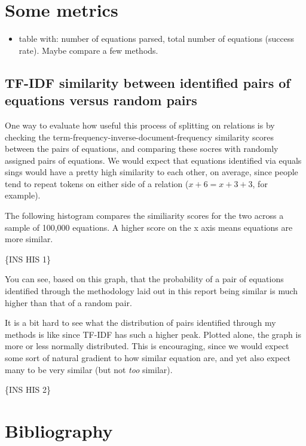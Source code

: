 \documentclass[]{article}
\providecommand{\tightlist}{%
  \setlength{\itemsep}{0pt}\setlength{\parskip}{0pt}}
\begin{document}
\hypertarget{some-metrics}{%
\section{Some metrics}\label{some-metrics}}

\begin{itemize}
\tightlist
\item
  table with: number of equations parsed, total number of equations
  (success rate). Maybe compare a few methods.
\end{itemize}

\hypertarget{tf-idf-similarity-between-identified-pairs-of-equations-versus-random-pairs}{%
\subsection{TF-IDF similarity between identified pairs of equations
versus random
pairs}\label{tf-idf-similarity-between-identified-pairs-of-equations-versus-random-pairs}}

One way to evaluate how useful this process of splitting on relations is
by checking the term-frequency-inverse-document-frequency similarity
scores between the pairs of equations, and comparing these socres with
randomly assigned pairs of equations. We would expect that equations
identified via equals sings would have a pretty high similarity to each
other, on average, since people tend to repeat tokens on either side of
a relation (\(x + 6 = x + 3 + 3\), for example).

The following histogram compares the similiarity scores for the two
across a sample of 100,000 equations. A higher score on the x axis means
equations are more similar.

\{INS HIS 1\}

You can see, based on this graph, that the probability of a pair of
equations identified through the methodology laid out in this report
being similar is much higher than that of a random pair.

It is a bit hard to see what the distribution of pairs identified
through my methods is like since TF-IDF has such a higher peak. Plotted
alone, the graph is more or less normally distributed. This is
encouraging, since we would expect some sort of natural gradient to how
similar equation are, and yet also expect many to be very similar (but
not \emph{too} similar).

\{INS HIS 2\}

\hypertarget{bibliography}{%
\section*{Bibliography}\label{bibliography}}
\end{document}
